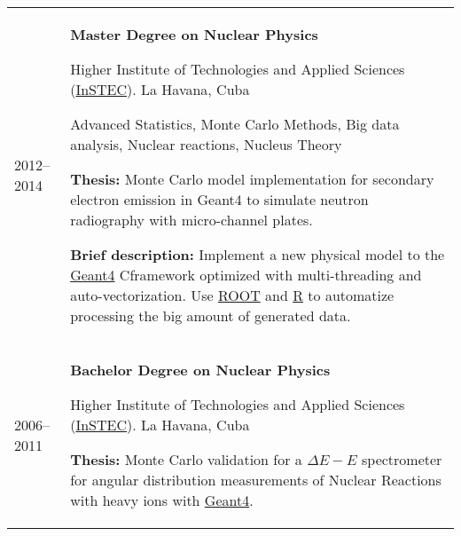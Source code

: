 \documentclass[a4paper,11pt]{article}
\def\CC{{C\nolinebreak[4]\hspace{-.05em}\raisebox{.2ex}{++}}}
\begin{document}
\begin{tabularx}{\linewidth}{@{}l X@{}}
  2012--2014 & \textbf{Master Degree on Nuclear Physics}

               Higher Institute of Technologies and Applied Sciences (\href{www.instec.cu}{InSTEC}).
               La Havana, Cuba

               Advanced Statistics, Monte Carlo Methods, Big data analysis, Nuclear reactions, Nucleus Theory

               \textbf{Thesis:} Monte Carlo model implementation for secondary electron emission in Geant4 to
               simulate neutron radiography with micro-channel plates.

               \textbf{Brief description:} Implement a new physical model to the
               \href{https://geant4.web.cern.ch/}{Geant4} \CC framework optimized with multi-threading
               and auto-vectorization. Use \href{https://root.cern/}{ROOT} and
               \href{https://www.r-project.org/}{R} to automatize processing the big amount of
               generated data.
  \\
  2006--2011 & \textbf{Bachelor Degree on Nuclear Physics}

               Higher Institute of Technologies and Applied Sciences (\href{www.instec.cu}{InSTEC}).
               La Havana, Cuba

               \textbf{Thesis:} Monte Carlo validation for a $\Delta E-E$ spectrometer for angular
               distribution measurements of Nuclear Reactions with heavy ions with
               \href{https://geant4.web.cern.ch/}{Geant4}.
  \\
\end{tabularx}

\end{document}
